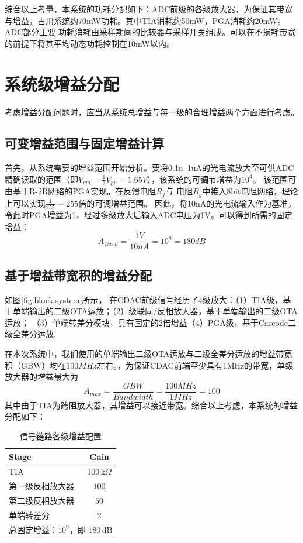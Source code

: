 综合以上考量，本系统的功耗分配如下：ADC前级的各级放大器，为保证其带宽与增益，占用系统约70mW功耗。其中TIA消耗约50mW，PGA消耗约20mW。 ADC部分主要
功耗消耗由采样期间的比较器与采样开关组成。可以在不损耗带宽的前提下将其平均动态功耗控制在10mW以内。

\section{系统级增益分配}
考虑增益分配问题时，应当从系统总增益与每一级的合理增益两个方面进行考虑。

\subsection{可变增益范围与固定增益计算}
首先，从系统需要的增益范围开始分析。要将0.1n~1uA的光电流放大至可供ADC精确读取的范围（即$V_{cm} = \frac{1}{2} V_{pp} = 1.65V$），该系统的可调节增益为$10^4$。
该范围可由基于R-2R网络的PGA实现。在反馈电阻$R_f$与  电阻$R_g$中接入8bit电阻网络，理论上可以实现$\frac{1}{255} \sim 255$倍的可调增益范围。
因此，将10nA的光电流输入作为基准，令此时PGA增益为1，经过多级放大后输入ADC电压为1V。可以得到所需的固定增益：
\begin{equation}
A_{fixed} = \frac{1V}{10nA} = 10^8  = 180dB
\end{equation}

\subsection{基于增益带宽积的增益分配}
如图\ref{fig:block.system}所示， 在CDAC前级信号经历了4级放大：（1）TIA级，基于单端输出的二级OTA运放；（2）级联同/反相放大器，基于单端输出的二级OTA运放；
（3）单端转差分模块，具有固定的2倍增益（4）PGA级，基于Cascode二级全差分运放.

在本次系统中，我们使用的单端输出二级OTA运放与二级全差分运放的增益带宽积（GBW）均在$100MHz$左右。，为保证CDAC前端至少具有1MHz的带宽，单级放大器的增益最大为
\begin{equation}
A_{max} = \frac{GBW}{Bandwidth} = \frac{100MHz}{1MHz} = 100
\end{equation}
其中由于TIA为跨阻放大器，其增益可以接近带宽。综合以上考虑，本系统的增益分配如下：

\begin{table}[htbp]
  \centering
  \caption{信号链路各级增益配置}
  \begin{tabular}{lc}
    \toprule
    Stage & Gain \\
    \midrule
    TIA & $100\,\text{k}\Omega$ \\
    第一级反相放大器 & $100$ \\
    第二级反相放大器 & $50$ \\
    单端转差分 & $2$ \\
    \midrule
    \multicolumn{2}{c}{总固定增益：$10^9$，即 $180\,\text{dB}$} \\
    \bottomrule
  \end{tabular}
  \label{tab:stage_gain}
\end{table}


